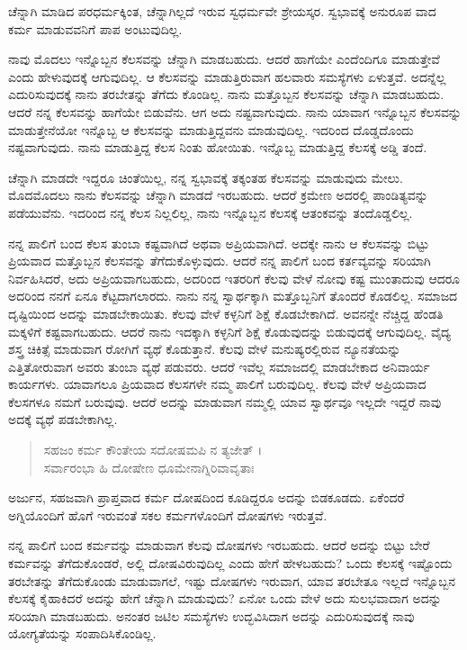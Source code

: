 {\small ಚೆನ್ನಾಗಿ ಮಾಡಿದ ಪರಧರ್ಮಕ್ಕಿಂತ, ಚೆನ್ನಾಗಿಲ್ಲದೆ ಇರುವ ಸ್ವಧರ್ಮವೇ ಶ್ರೇಯಸ್ಕರ. ಸ್ವಭಾವಕ್ಕೆ ಅನುರೂಪ ವಾದ ಕರ್ಮ ಮಾಡುವವನಿಗೆ ಪಾಪ ಅಂಟುವುದಿಲ್ಲ.}

ನಾವು ಮೊದಲು ಇನ್ನೊಬ್ಬನ ಕೆಲಸವನ್ನು ಚೆನ್ನಾಗಿ ಮಾಡಬಹುದು. ಆದರೆ ಹಾಗೆಯೇ ಎಂದೆಂದಿಗೂ ಮಾಡುತ್ತೇವೆ ಎಂದು ಹೇಳುವುದಕ್ಕೆ ಆಗುವುದಿಲ್ಲ. ಆ ಕೆಲಸವನ್ನು ಮಾಡುತ್ತಿರುವಾಗ ಹಲವಾರು ಸಮಸ್ಯೆಗಳು ಏಳುತ್ತವೆ. ಅದನ್ನೆಲ್ಲ ಎದುರಿಸುವುದಕ್ಕೆ ನಾನು ತರಬೇತನ್ನು ತೆಗೆದು ಕೊಂಡಿಲ್ಲ. ನಾನು ಮತ್ತೊಬ್ಬನ ಕೆಲಸವನ್ನು ಚೆನ್ನಾಗಿ ಮಾಡಬಹುದು. ಆದರೆ ನನ್ನ ಕೆಲಸವನ್ನು ಹಾಗೆಯೇ ಬಿಡುವೆನು. ಆಗ ಅದು ನಷ್ಟವಾಗುವುದು. ನಾನು ಯಾವಾಗ ಇನ್ನೊಬ್ಬನ ಕೆಲಸವನ್ನು ಮಾಡುತ್ತೇನೆಯೋ ಇನ್ನೊಬ್ಬ ಆ ಕೆಲಸವನ್ನು ಮಾಡುತ್ತಿದ್ದವನು ಮಾಡುವುದಿಲ್ಲ. ಇದರಿಂದ ದೊಡ್ಡದೊಂದು ನಷ್ಟವಾಗುವುದು. ನಾನು ಮಾಡುತ್ತಿದ್ದ ಕೆಲಸ ನಿಂತು ಹೋಯಿತು. ಇನ್ನೊಬ್ಬ ಮಾಡುತ್ತಿದ್ದ ಕೆಲಸಕ್ಕೆ ಅಡ್ಡಿ ತಂದೆ.

ಚೆನ್ನಾಗಿ ಮಾಡದೇ ಇದ್ದರೂ ಚಿಂತೆಯಿಲ್ಲ, ನನ್ನ ಸ್ವಭಾವಕ್ಕೆ ತಕ್ಕಂತಹ ಕೆಲಸವನ್ನು ಮಾಡುವುದು ಮೇಲು. ಮೊದಮೊದಲು ನಾನು ಕೆಲಸವನ್ನು ಚೆನ್ನಾಗಿ ಮಾಡದೆ ಇರಬಹುದು. ಆದರೆ ಕ್ರಮೇಣ ಅದರಲ್ಲಿ ಪಾಂಡಿತ್ಯವನ್ನು ಪಡೆಯುವೆನು. ಇದರಿಂದ ನನ್ನ ಕೆಲಸ ನಿಲ್ಲಲಿಲ್ಲ, ನಾನು ಇನ್ನೊಬ್ಬನ ಕೆಲಸಕ್ಕೆ ಆತಂಕವನ್ನು ತಂದೊಡ್ಡಲಿಲ್ಲ.

ನನ್ನ ಪಾಲಿಗೆ ಬಂದ ಕೆಲಸ ತುಂಬಾ ಕಷ್ಟವಾಗಿದೆ ಅಥವಾ ಅಪ್ರಿಯವಾಗಿದೆ. ಅದಕ್ಕೇ ನಾನು ಆ ಕೆಲಸವನ್ನು ಬಿಟ್ಟು ಪ್ರಿಯವಾದ ಮತ್ತೊಬ್ಬನ ಕೆಲಸವನ್ನು ತೆಗೆದುಕೊಳ್ಳುವುದು. ಆದರೆ ನನ್ನ ಪಾಲಿಗೆ ಬಂದ ಕರ್ತವ್ಯವನ್ನು ಸರಿಯಾಗಿ ನಿರ್ವಹಿಸಿದರೆ, ಅದು ಅಪ್ರಿಯವಾಗಬಹುದು, ಅದರಿಂದ ಇತರರಿಗೆ ಕೆಲವು ವೇಳೆ ನೋವು ಕಷ್ಟ ಮುಂತಾದುವು ಆದರೂ ಅದರಿಂದ ನನಗೆ ಏನೂ ಕೆಟ್ಟದಾಗಲಾರದು. ನಾನು ನನ್ನ ಸ್ವಾರ್ಥಕ್ಕಾಗಿ ಮತ್ತೊಬ್ಬನಿಗೆ ತೊಂದರೆ ಕೊಡಲಿಲ್ಲ. ಸಮಾಜದ ದೃಷ್ಟಿಯಿಂದ ಅದನ್ನು ಮಾಡಬೇಕಾಯಿತು. ಕೆಲವು ವೇಳೆ ಕಳ್ಳನಿಗೆ ಶಿಕ್ಷೆ ಕೊಡಬೇಕಾಗಿದೆ. ಅವನನ್ನೇ ನೆಚ್ಚಿದ್ದ ಹೆಂಡತಿ ಮಕ್ಕಳಿಗೆ ಕಷ್ಟವಾಗಬಹುದು. ಆದರೆ ನಾನು ಇದಕ್ಕಾಗಿ ಕಳ್ಳನಿಗೆ ಶಿಕ್ಷೆ ಕೊಡುವುದನ್ನು ಬಿಡುವುದಕ್ಕೆ ಆಗುವುದಿಲ್ಲ. ವೈದ್ಯ ಶಸ್ತ್ರ ಚಿಕಿತ್ಸೆ ಮಾಡುವಾಗ ರೋಗಿಗೆ ವ್ಯಥೆ ಕೊಡುತ್ತಾನೆ. ಕೆಲವು ವೇಳೆ ಮನುಷ್ಯರಲ್ಲಿರುವ ನ್ಯೂನತೆಯನ್ನು ಎತ್ತಿತೋರುವಾಗ ಅವರು ತುಂಬಾ ವ್ಯಥೆ ಪಡುವರು. ಆದರೆ ಇವೆಲ್ಲ ಸಮಾಜದಲ್ಲಿ ಮಾಡಬೇಕಾದ ಅನಿವಾರ್ಯ ಕಾರ್ಯಗಳು. ಯಾವಾಗಲೂ ಪ್ರಿಯವಾದ ಕೆಲಸಗಳೇ ನಮ್ಮ ಪಾಲಿಗೆ ಬರುವುದಿಲ್ಲ. ಕೆಲವು ವೇಳೆ ಅಪ್ರಿಯವಾದ ಕೆಲಸಗಳೂ ನಮಗೆ ಬರುವುವು. ಆದರೆ ಅದನ್ನು ಮಾಡುವಾಗ ನಮ್ಮಲ್ಲಿ ಯಾವ ಸ್ವಾರ್ಥವೂ ಇಲ್ಲದೇ ಇದ್ದರೆ ನಾವು ಅದಕ್ಕೆ ವ್ಯಥೆ ಪಡಬೇಕಾಗಿಲ್ಲ.

\begin{verse}
ಸಹಜಂ ಕರ್ಮ ಕೌಂತೇಯ ಸದೋಷಮಪಿ ನ ತ್ಯಜೇತ್ ।\\ಸರ್ವಾರಂಭಾ ಹಿ ದೋಷೇಣ ಧೂಮೇನಾಗ್ನಿರಿವಾವೃತಾಃ 
\end{verse}

{\small ಅರ್ಜುನ, ಸಹಜವಾಗಿ ಪ್ರಾಪ್ತವಾದ ಕರ್ಮ ದೋಷದಿಂದ ಕೂಡಿದ್ದರೂ ಅದನ್ನು ಬಿಡಕೂಡದು. ಏಕೆಂದರೆ ಅಗ್ನಿಯೊಂದಿಗೆ ಹೊಗೆ ಇರುವಂತೆ ಸಕಲ ಕರ್ಮಗಳೊಂದಿಗೆ ದೋಷಗಳು ಇರುತ್ತವೆ.}

ನನ್ನ ಪಾಲಿಗೆ ಬಂದ ಕರ್ಮವನ್ನು ಮಾಡುವಾಗ ಕೆಲವು ದೋಷಗಳು ಇರಬಹುದು. ಆದರೆ ಅದನ್ನು ಬಿಟ್ಟು ಬೇರೆ ಕರ್ಮವನ್ನು ತೆಗೆದುಕೊಂಡರೆ, ಅಲ್ಲಿ ದೋಷವಿರುವುದಿಲ್ಲ ಎಂದು ಹೇಗೆ ಹೇಳಬಹುದು? ಒಂದು ಕೆಲಸಕ್ಕೆ ಇಷ್ಟೊಂದು ತರಬೇತನ್ನು ತೆಗೆದುಕೊಂಡು ಮಾಡುವಾಗಲೆ, ಇಷ್ಟು ದೋಷಗಳು ಇರುವಾಗ, ಯಾವ ತರಬೇತೂ ಇಲ್ಲದೆ ಇನ್ನೊಬ್ಬನ ಕೆಲಸಕ್ಕೆ ಕೈಹಾಕಿದರೆ ಅದನ್ನು ಹೇಗೆ ಚೆನ್ನಾಗಿ ಮಾಡುವುದು? ಏನೋ ಒಂದು ವೇಳೆ ಅದು ಸುಲಭವಾದಾಗ ಅದನ್ನು ಸರಿಯಾಗಿ ಮಾಡಬಹುದು. ಅನಂತರ ಜಟಿಲ ಸಮಸ್ಯೆಗಳು ಉದ್ಭವಿಸಿದಾಗ ಅದನ್ನು ಎದುರಿಸುವುದಕ್ಕೆ ನಾವು ಯೋಗ್ಯತೆಯನ್ನು ಸಂಪಾದಿಸಿಕೊಂಡಿಲ್ಲ.

